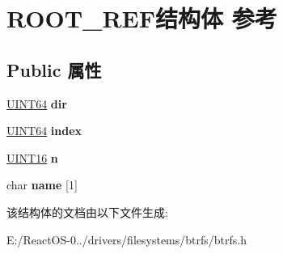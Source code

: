\hypertarget{struct_r_o_o_t___r_e_f}{}\section{R\+O\+O\+T\+\_\+\+R\+E\+F结构体 参考}
\label{struct_r_o_o_t___r_e_f}
\subsection*{Public 属性}
\begin{DoxyCompactItemize}
\item 
\mbox{\label{struct_r_o_o_t___r_e_f_a3e123f3194706c9393dfd37ed9704abe}} 
\hyperlink{_processor_bind_8h_a57be03562867144161c1bfee95ca8f7c}{U\+I\+N\+T64} {\bfseries dir}
\item 
\mbox{\label{struct_r_o_o_t___r_e_f_a0e103a39b65fe1bad5168093ed1f9c63}} 
\hyperlink{_processor_bind_8h_a57be03562867144161c1bfee95ca8f7c}{U\+I\+N\+T64} {\bfseries index}
\item 
\mbox{\label{struct_r_o_o_t___r_e_f_a407bb0134469c403ca585856b9256af1}} 
\hyperlink{_processor_bind_8h_a09f1a1fb2293e33483cc8d44aefb1eb1}{U\+I\+N\+T16} {\bfseries n}
\item 
\mbox{\label{struct_r_o_o_t___r_e_f_a9565921dfe816e242c538c1bfe65668c}} 
char {\bfseries name} \mbox{[}1\mbox{]}
\end{DoxyCompactItemize}


该结构体的文档由以下文件生成\+:\begin{DoxyCompactItemize}
\item 
E\+:/\+React\+O\+S-\/0../drivers/filesystems/btrfs/btrfs.\+h\end{DoxyCompactItemize}

